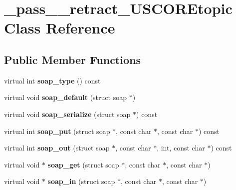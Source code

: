 \hypertarget{class__pass____retract__USCOREtopic}{
\section{\_\-pass\_\-\_\-retract\_\-USCOREtopic Class Reference}
\label{class__pass____retract__USCOREtopic}
}
\subsection*{Public Member Functions}
\begin{DoxyCompactItemize}
\item 
\hypertarget{class__pass____retract__USCOREtopic_af39d8cde1a3f0bd02c89625578983268}{
virtual int {\bfseries soap\_\-type} () const }
\label{class__pass____retract__USCOREtopic_af39d8cde1a3f0bd02c89625578983268}

\item 
\hypertarget{class__pass____retract__USCOREtopic_a81c6065c3167bb29f73f020b062ebd34}{
virtual void {\bfseries soap\_\-default} (struct soap $\ast$)}
\label{class__pass____retract__USCOREtopic_a81c6065c3167bb29f73f020b062ebd34}

\item 
\hypertarget{class__pass____retract__USCOREtopic_a4f16493407113fbcd9dbfc874cab92ae}{
virtual void {\bfseries soap\_\-serialize} (struct soap $\ast$) const }
\label{class__pass____retract__USCOREtopic_a4f16493407113fbcd9dbfc874cab92ae}

\item 
\hypertarget{class__pass____retract__USCOREtopic_af90758e69a573d74657f10bda7b1ba4e}{
virtual int {\bfseries soap\_\-put} (struct soap $\ast$, const char $\ast$, const char $\ast$) const }
\label{class__pass____retract__USCOREtopic_af90758e69a573d74657f10bda7b1ba4e}

\item 
\hypertarget{class__pass____retract__USCOREtopic_ac2d50587aa86dc5ec7e723d1baa3cd71}{
virtual int {\bfseries soap\_\-out} (struct soap $\ast$, const char $\ast$, int, const char $\ast$) const }
\label{class__pass____retract__USCOREtopic_ac2d50587aa86dc5ec7e723d1baa3cd71}

\item 
\hypertarget{class__pass____retract__USCOREtopic_aa1137d1c80bab18778695375f2c9ac63}{
virtual void $\ast$ {\bfseries soap\_\-get} (struct soap $\ast$, const char $\ast$, const char $\ast$)}
\label{class__pass____retract__USCOREtopic_aa1137d1c80bab18778695375f2c9ac63}

\item 
\hypertarget{class__pass____retract__USCOREtopic_a3692171d527f33bad7894ff043438d5f}{
virtual void $\ast$ {\bfseries soap\_\-in} (struct soap $\ast$, const char $\ast$, const char $\ast$)}
\label{class__pass____retract__USCOREtopic_a3692171d527f33bad7894ff043438d5f}

\end{DoxyCompactItemize}
